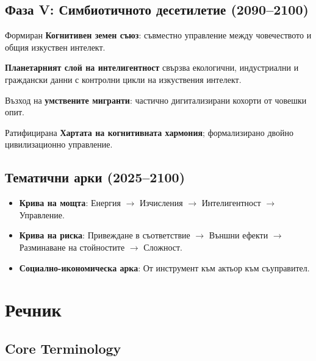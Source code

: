 \documentclass[11pt]{article}
\begin{document}
\subsection{Фаза V: Симбиотичното десетилетие (2090–2100)}
\begin{description}[style=nextline,leftmargin=2cm]
  \item[2092] Формиран \textbf{Когнитивен земен съюз}: съвместно управление между човечеството и общия изкуствен интелект.
  \item[2095] \textbf{Планетарният слой на интелигентност} свързва екологични, индустриални и граждански данни с контролни цикли на изкуствения интелект.
  \item[2098] Възход на \textbf{умствените мигранти}: частично дигитализирани кохорти от човешки опит.
  \item[2100] Ратифицирана \textbf{Хартата на когнитивната хармония}; формализирано двойно цивилизационно управление.
\end{description}

\subsection{Тематични арки (2025–2100)}
\begin{itemize}[noitemsep]
  \item \textbf{Крива на мощта}: Енергия $\rightarrow$ Изчисления $\rightarrow$ Интелигентност $\rightarrow$ Управление.
  \item \textbf{Крива на риска}: Привеждане в съответствие $\rightarrow$ Външни ефекти $\rightarrow$ Разминаване на стойностите $\rightarrow$ Сложност.
  \item \textbf{Социално-икономическа арка}: От инструмент към актьор към съуправител.
\end{itemize}

\clearpage

\section*{Речник}

\subsection*{Core Terminology}
\end{document}
